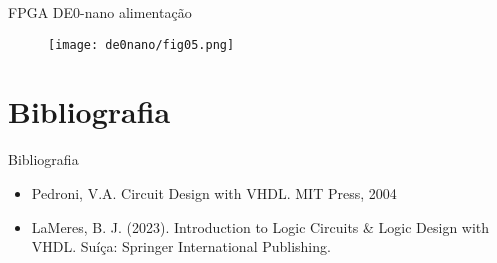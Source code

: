 \documentclass[aspectratio=169]{beamer}
\begin{document}
\begin{frame}{FPGA DE0-nano alimentação}
	\justifying
	
	
	\begin{figure}[h]
		\centering
		\texttt{[image: de0nano/fig05.png]}
	\end{figure}	
	
\end{frame}


\section{Bibliografia}

\begin{frame}{Bibliografia}
	\justifying
	
	\begin{itemize}
		\item Pedroni, V.A. Circuit Design with VHDL. MIT Press, 2004
		\item LaMeres, B. J. (2023). Introduction to Logic Circuits \& Logic Design with VHDL. Suíça: Springer International Publishing.
	\end{itemize}
	
\end{frame}
\end{document}

